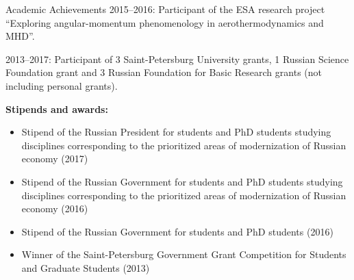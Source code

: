 \documentclass{resume} %
\begin{document}
\begin{rSection}{Academic Achievements}
2015--2016: Participant of the ESA research project ``Exploring angular-momentum phenomenology in aerothermodynamics and MHD''.

2013--2017: Participant of 3 Saint-Petersburg University grants, 1 Russian Science Foundation grant and 3 Russian Foundation for Basic Research grants (not including personal grants).

{\bf Stipends and awards:}
\begin{itemize}
    \item Stipend of the Russian President for students and PhD students studying disciplines corresponding to the prioritized areas of modernization of Russian economy (2017)
    \item Stipend of the Russian Government for students and PhD students studying disciplines corresponding to the prioritized areas of modernization of Russian economy (2016)
    \item Stipend of the Russian Government for students and PhD students (2016)
    \item Winner of the Saint-Petersburg Government Grant Competition for Students and Graduate Students (2013)
\end{itemize}
\end{rSection}

\newpage
\end{document}
